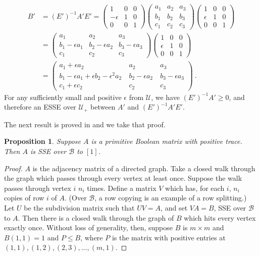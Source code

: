 \documentclass{amsart}
\newtheorem{proposition}[theorem]{Proposition}
\theoremstyle{definition}
\theoremstyle{remark}
\numberwithin{equation}{section}
\begin{document}
{{\begin{align*}
B' &=(E')^{-1} A'E' =
\begin{pmatrix} 
1 & 0 & 0 \\ 
-\epsilon & 1 &0 \\ 0 & 0 & 1 
\end{pmatrix} 
 \begin{pmatrix} 
a_1 & a_2 & a_3 \\
b_1 & b_2 & b_3 \\
c_1 & c_2 & c_3 
\end{pmatrix} 
\begin{pmatrix} 
1 & 0 & 0 \\ 
\epsilon & 1 &0 \\ 0 & 0 & 1 
\end{pmatrix} 
\\
&=
\begin{pmatrix} 
a_1 & a_2 & a_3 \\
b_1 -\epsilon a_1 & b_2 -\epsilon a_2& b_3 -\epsilon a_3\\
c_1 & c_2 & c_3 
\end{pmatrix} 
\begin{pmatrix} 
1 & 0 & 0 \\ 
\epsilon & 1 &0 \\ 0 & 0 & 1 
\end{pmatrix} 
\\
&=
\begin{pmatrix} 
a_1+\epsilon a_2 & a_2 & a_3 \\
b_1 -\epsilon a_1+\epsilon b_2-\epsilon^2a_2 \ 
& b_2 -\epsilon a_2 \  & b_3 -\epsilon a_3\\
c_1 +\epsilon c_2& c_2 & c_3 
\end{pmatrix} \ .
 \end{align*}
For any sufficiently small and positive $\epsilon$ 
from $\mathcal U$, we have 
$(E')^{-1} A'\geq 0$, and therefore an ESSE over $\mathcal U_+$ 
between $A'$ and 
$(E')^{-1} A'E'$. 

The next result is proved in \cite{KR0} and we take that proof.

\begin{proposition} \label{booleanprop}
Suppose $A$ is a  primitive Boolean matrix with positive 
trace. Then $A$ is SSE over $\mathcal B$ to 
$[1]$.
\end{proposition} 

\begin{proof} 
$A$ is the adjacency matrix of a directed graph. 
 Take a closed walk through the graph  which passes through
every vertex at least once. 
Suppose the walk passes through vertex $i$ $n_i$ times. 
Define a matrix $V$ which has, for each $i$, $n_i$ copies 
of row $i$ of $A$. 
(Over $\mathcal B$, a row copying is an example of a row splitting.) 
Let $U$ be the subdivision matrix such that 
$UV=A$, and set $VA=B$, SSE over $\mathcal B$ to 
$A$.  Then there is a closed walk through the graph of 
$B$ which hits every vertex exactly once. Without loss of generality, 
then, suppose $B$ is $m\times m$ and 
$B(1,1)=1$ and $P\leq B$, where $P$ is 
 the  matrix with positive entries at 
$(1,1),(1,2),(2,3), \ldots ,(m,1)$. 


\end{proof}}}
\end{document}
